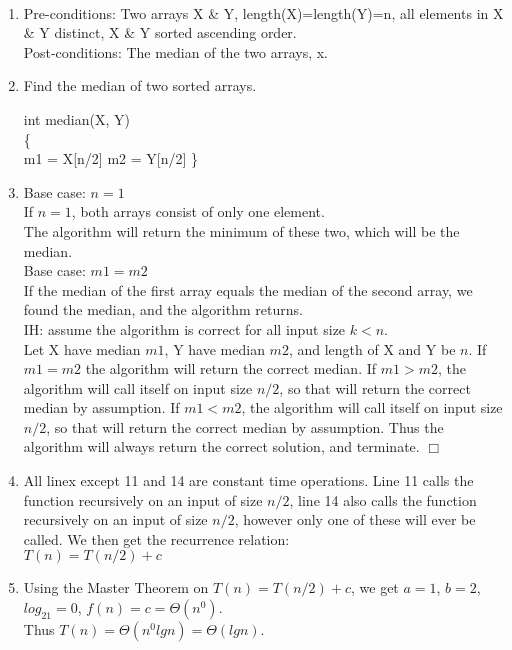 \documentclass{assignment}
\begin{document}
\begin{problemlist}
\clearpage
\pbitem
\begin{problem}
\end{problem}
\begin{answer}
\\
\begin{enumerate}
\item
Pre-conditions: Two arrays X \& Y, length(X)=length(Y)=n, all elements in X \& Y distinct, X \& Y sorted ascending order.\\
Post-conditions: The median of the two arrays, x.\\
\item
Find the median of two sorted arrays.\\
\IncMargin{3em}
\begin{algorithm}
  int median(X, Y)\\\{\\
  \Indp
  m1 = X[n/2]\;
  m2 = Y[n/2]\;
  \Indm
  \}
\end{algorithm}
\DecMargin{3em}
\item
Base case: $n=1$\\
If $n=1$, both arrays consist of only one element.\\
The algorithm will return the minimum of these two, which will be the median.\\
Base case: $m1=m2$\\
If the median of the first array equals the median of the second array, we found the median, and the algorithm returns.\\
IH: assume the algorithm is correct for all input size $k < n$.\\
Let X have median $m1$, Y have median $m2$, and length of X and Y be $n$. If $m1=m2$ the algorithm will return the correct median. If $m1 > m2$, the algorithm will call itself on input size $n/2$, so that will return the correct median by assumption. If $m1 < m2$, the algorithm will call itself on input size $n/2$, so that will return the correct median by assumption. Thus the algorithm will always return the correct solution, and terminate. $\Box$\\
\item
All linex except 11 and 14 are constant time operations. Line 11 calls the function recursively on an input of size $n/2$, line 14 also calls the function recursively on an input of size $n/2$, however only one of these will ever be called. We then get the recurrence relation:\\
$T(n)=T(n/2) + c$\\
\item
Using the Master Theorem on $T(n)=T(n/2) + c$, we get $a=1$, $b=2$, $log_21=0$, $f(n)=c=\Theta (n^0)$.\\
Thus $T(n)=\Theta (n^0lg n)=\Theta (lg n)$.\\
\end{enumerate}
\end{answer}

\end{problemlist}
\end{document}
